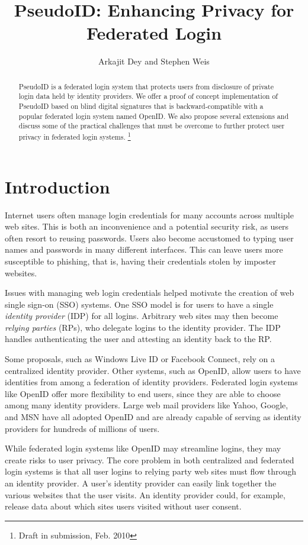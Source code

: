 \documentclass{llncs}
\title{PseudoID: Enhancing Privacy for Federated Login}
\author{Arkajit Dey\inst{1} and Stephen Weis\inst{2}}
\institute{Massachusetts Institute of Technology, Cambridge, MA, USA 02139
\and
Google Inc., Mountain View, CA, USA 94043}
\begin{document}
\maketitle

\begin{abstract}
  PseudoID is a federated login system that protects users from
  disclosure of private login data held by identity providers. We
  offer a proof of concept implementation of PseudoID based on blind
  digital signatures that is backward-compatible with a popular
  federated login system named OpenID. We also propose several
  extensions and discuss some of the practical challenges that must be
  overcome to further protect user privacy in federated login systems.
  \footnote{Draft in submission, Feb. 2010}
\end{abstract}

\section{Introduction}
\label{sec:intro}

Internet users often manage login credentials for many accounts across
multiple web sites. This is both an inconvenience and a potential
security risk, as users often resort to reusing passwords. Users also
become accustomed to typing user names and passwords in many different
interfaces. This can leave users more susceptible to phishing, that
is, having their credentials stolen by imposter websites.

Issues with managing web login credentials helped motivate the
creation of web single sign-on (SSO) systems. One SSO model is for
users to have a single \emph{identity provider} (IDP) for all
logins. Arbitrary web sites may then become \emph{relying parties}
(RPs), who delegate logins to the identity provider. The IDP handles
authenticating the user and attesting an identity back to the RP.

Some proposals, such as Windows Live ID or Facebook Connect, rely on a
centralized identity provider. Other systems, such as OpenID, allow
users to have identities from among a federation of identity
providers. Federated login systems like OpenID offer more flexibility
to end users, since they are able to choose among many identity
providers. Large web mail providers like Yahoo, Google, and MSN have
all adopted OpenID \cite{Yah08,Sac08,WLOP08} and are already capable
of serving as identity providers for hundreds of millions of users.

While federated login systems like OpenID may streamline logins, they
may create risks to user privacy. The core problem in both centralized
and federated login systems is that all user logins to relying party
web sites must flow through an identity provider. A user's identity
provider can easily link together the various websites that the user
visits. An identity provider could, for example, release data about
which sites users visited without user consent.
\end{document}

